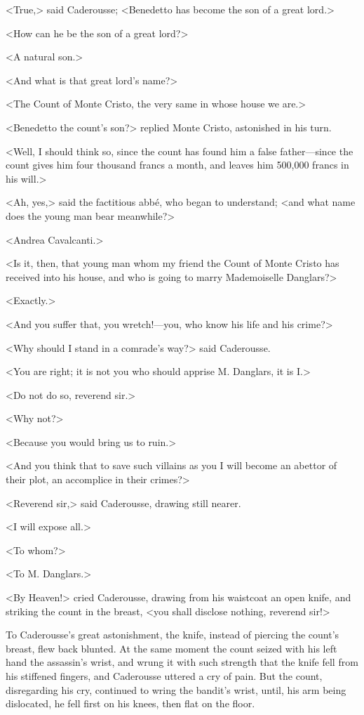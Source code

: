  <True,> said Caderousse; <Benedetto has become the son of a great lord.> 

 <How can he be the son of a great lord?> 

 <A natural son.> 

 <And what is that great lord's name?> 

 <The Count of Monte Cristo, the very same in whose house we are.> 

 <Benedetto the count's son?> replied Monte Cristo, astonished in his turn. 

 <Well, I should think so, since the count has found him a false father—since the count gives him four thousand francs a month, and leaves him 500,000 francs in his will.> 

 <Ah, yes,> said the factitious abbé, who began to understand; <and what name does the young man bear meanwhile?> 

 <Andrea Cavalcanti.> 

 <Is it, then, that young man whom my friend the Count of Monte Cristo has received into his house, and who is going to marry Mademoiselle Danglars?> 

 <Exactly.> 

 <And you suffer that, you wretch!—you, who know his life and his crime?> 

 <Why should I stand in a comrade's way?> said Caderousse. 

 <You are right; it is not you who should apprise M. Danglars, it is I.> 

 <Do not do so, reverend sir.> 

 <Why not?> 

 <Because you would bring us to ruin.> 

 <And you think that to save such villains as you I will become an abettor of their plot, an accomplice in their crimes?> 

 <Reverend sir,> said Caderousse, drawing still nearer. 

 <I will expose all.> 

 <To whom?> 

 <To M. Danglars.> 

 <By Heaven!> cried Caderousse, drawing from his waistcoat an open knife, and striking the count in the breast, <you shall disclose nothing, reverend sir!> 

 To Caderousse's great astonishment, the knife, instead of piercing the count's breast, flew back blunted. At the same moment the count seized with his left hand the assassin's wrist, and wrung it with such strength that the knife fell from his stiffened fingers, and Caderousse uttered a cry of pain. But the count, disregarding his cry, continued to wring the bandit's wrist, until, his arm being dislocated, he fell first on his knees, then flat on the floor. 

